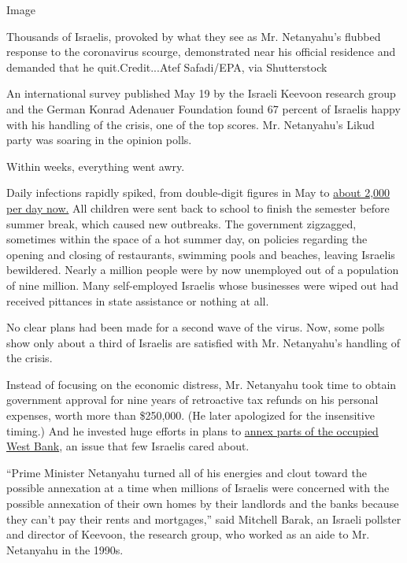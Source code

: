 Image

Thousands of Israelis, provoked by what they see as Mr. Netanyahu's
flubbed response to the coronavirus scourge, demonstrated near his
official residence and demanded that he quit.Credit...Atef Safadi/EPA,
via Shutterstock

An international survey published May 19 by the Israeli Keevoon research
group and the German Konrad Adenauer Foundation found 67 percent of
Israelis happy with his handling of the crisis, one of the top scores.
Mr. Netanyahu's Likud party was soaring in the opinion polls.

Within weeks, everything went awry.

Daily infections rapidly spiked, from double-digit figures in May to
\href{https://ourworldindata.org/coronavirus-data-explorer?zoomToSelection=true\&country=~ISR\&casesMetric=true\&dailyFreq=true\&hideControls=true\&smoothing=0\&pickerMetric=location\&pickerSort=asc}{about
2,000 per day now.} All children were sent back to school to finish the
semester before summer break, which caused new outbreaks. The government
zigzagged, sometimes within the space of a hot summer day, on policies
regarding the opening and closing of restaurants, swimming pools and
beaches, leaving Israelis bewildered. Nearly a million people were by
now unemployed out of a population of nine million. Many self-employed
Israelis whose businesses were wiped out had received pittances in state
assistance or nothing at all.

No clear plans had been made for a second wave of the virus. Now, some
polls show only about a third of Israelis are satisfied with Mr.
Netanyahu's handling of the crisis.

Instead of focusing on the economic distress, Mr. Netanyahu took time to
obtain government approval for nine years of retroactive tax refunds on
his personal expenses, worth more than \$250,000. (He later apologized
for the insensitive timing.) And he invested huge efforts in plans to
\href{https://www.nytimes.com/2020/07/01/world/middleeast/israel-annexation-netanyahu-johnson.html?searchResultPosition=3}{annex
parts of the occupied West Bank}, an issue that few Israelis cared
about.

``Prime Minister Netanyahu turned all of his energies and clout toward
the possible annexation at a time when millions of Israelis were
concerned with the possible annexation of their own homes by their
landlords and the banks because they can't pay their rents and
mortgages,'' said Mitchell Barak, an Israeli pollster and director of
Keevoon, the research group, who worked as an aide to Mr. Netanyahu in
the 1990s.

